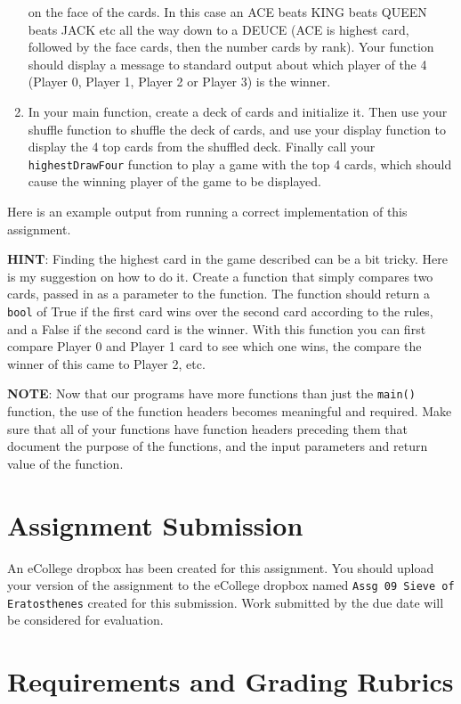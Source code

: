 \documentclass[11pt]{article}
\begin{document}
\begin{enumerate}
   on the face of the cards.  In this case an ACE beats KING beats
   QUEEN beats JACK etc all the way down to a DEUCE (ACE is highest
   card, followed by the face cards, then the number cards by rank).
   Your function should display a message to standard output about
   which player of the 4 (Player 0, Player 1, Player 2 or Player 3)
   is the winner.
\item In your main function, create a deck of cards and initialize it.
   Then use your shuffle function to shuffle the deck of cards, and
   use your display function to display the 4 top cards from the
   shuffled deck.  Finally call your \verb~highestDrawFour~ function
   to play a game with the top 4 cards, which should cause
   the winning player of the game to be displayed.
\end{enumerate}

Here is an example output from running a correct implementation of
this assignment.


\textbf{HINT}: Finding the highest card in the game described can be a bit
tricky.  Here is my suggestion on how to do it.  Create a function
that simply compares two cards, passed in as a parameter to the
function.  The function should return a \verb~bool~ of True if the first card
wins over the second card according to the rules, and a False if the
second card is the winner.  With this function you can first compare
Player 0 and Player 1 card to see which one wins, the compare the
winner of this came to Player 2, etc.

\textbf{NOTE}: Now that our programs have more functions than just the
\verb~main()~ function, the use of the function headers becomes meaningful
and required.  Make sure that all of your functions have function
headers preceding them that document the purpose of the functions, and
the input parameters and return value of the function.
\section*{Assignment Submission}
\label{sec-4}


An eCollege dropbox has been created for this assignment.  You should
upload your version of the assignment to the eCollege dropbox named
\verb~Assg 09 Sieve of Eratosthenes~ created for this submission.  Work
submitted by the due date will be considered for evaluation.
\section*{Requirements and Grading Rubrics}
\label{sec-5}
\end{document}

